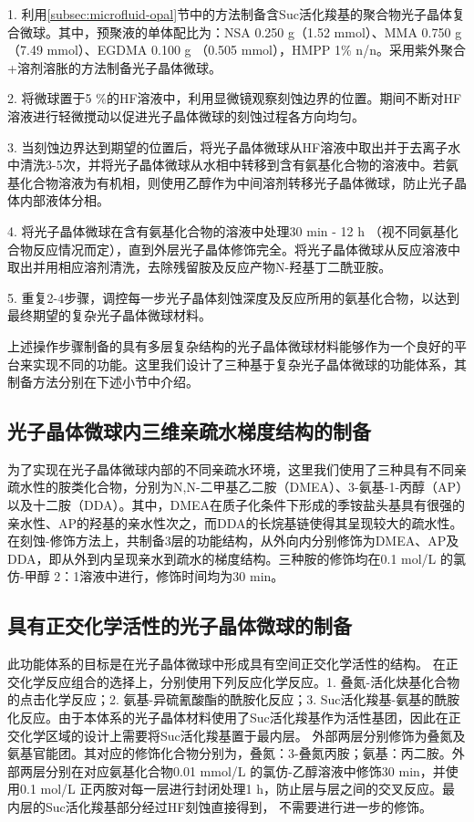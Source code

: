 1. 利用\ref{subsec:microfluid-opal}节中的方法制备含Suc活化羧基的聚合物光子晶体复合微球。其中，预聚液的单体配比为：NSA 0.250 g（1.52 mmol）、MMA 0.750 g（7.49 mmol）、EGDMA 0.100 g （0.505 mmol），HMPP 1\% n/n。采用紫外聚合+溶剂溶胀的方法制备光子晶体微球。

2. 将微球置于5 \%的HF溶液中，利用显微镜观察刻蚀边界的位置。期间不断对HF溶液进行轻微搅动以促进光子晶体微球的刻蚀过程各方向均匀。

3. 当刻蚀边界达到期望的位置后，将光子晶体微球从HF溶液中取出并于去离子水中清洗3-5次，并将光子晶体微球从水相中转移到含有氨基化合物的溶液中。若氨基化合物溶液为有机相，则使用乙醇作为中间溶剂转移光子晶体微球，防止光子晶体内部液体分相。

4. 将光子晶体微球在含有氨基化合物的溶液中处理30 min - 12 h （视不同氨基化合物反应情况而定），直到外层光子晶体修饰完全。将光子晶体微球从反应溶液中取出并用相应溶剂清洗，去除残留胺及反应产物N-羟基丁二酰亚胺。

5. 重复2-4步骤，调控每一步光子晶体刻蚀深度及反应所用的氨基化合物，以达到最终期望的复杂光子晶体微球材料。

上述操作步骤制备的具有多层复杂结构的光子晶体微球材料能够作为一个良好的平台来实现不同的功能。这里我们设计了三种基于复杂光子晶体微球的功能体系，其制备方法分别在下述小节中介绍。

\subsection{光子晶体微球内三维亲疏水梯度结构的制备}

为了实现在光子晶体微球内部的不同亲疏水环境，这里我们使用了三种具有不同亲疏水性的胺类化合物，分别为N,N-二甲基乙二胺（DMEA）、3-氨基-1-丙醇（AP）以及十二胺（DDA）。其中，DMEA在质子化条件下形成的季铵盐头基具有很强的亲水性、AP的羟基的亲水性次之，而DDA的长烷基链使得其呈现较大的疏水性。
在刻蚀-修饰方法上，共制备3层的功能结构，从外向内分别修饰为DMEA、AP及DDA，即从外到内呈现亲水到疏水的梯度结构。三种胺的修饰均在0.1 mol/L 的氯仿-甲醇 2：1溶液中进行，修饰时间均为30 min。

\subsection{具有正交化学活性的光子晶体微球的制备}

此功能体系的目标是在光子晶体微球中形成具有空间正交化学活性的结构。
在正交化学反应组合的选择上，分别使用下列反应化学反应。1. 叠氮-活化炔基化合物的点击化学反应；2. 氨基-异硫氰酸酯的酰胺化反应；3. Suc活化羧基-氨基的酰胺化反应。由于本体系的光子晶体材料使用了Suc活化羧基作为活性基团，因此在正交化学区域的设计上需要将Suc活化羧基置于最内层。
外部两层分别修饰为叠氮及氨基官能团。其对应的修饰化合物分别为，叠氮：3-叠氮丙胺；氨基：丙二胺。外部两层分别在对应氨基化合物0.01 mmol/L 的氯仿-乙醇溶液中修饰30 min，并使用0.1 mol/L 正丙胺对每一层进行封闭处理1 h，防止层与层之间的交叉反应。最内层的Suc活化羧基部分经过HF刻蚀直接得到，
不需要进行进一步的修饰。


